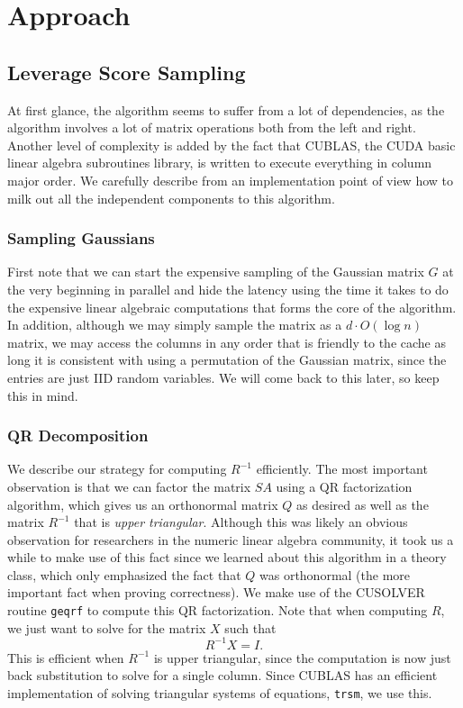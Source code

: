 \documentclass[12pt]{article}
\begin{document}
\section{Approach}

\subsection{Leverage Score Sampling}
At first glance, the algorithm seems to suffer from a lot of dependencies, as the algorithm involves a lot of matrix operations both from the left and right. Another level of complexity is added by the fact that CUBLAS, the CUDA basic linear algebra subroutines library, is written to execute everything in column major order. We carefully describe from an implementation point of view how to milk out all the independent components to this algorithm.

\subsubsection{Sampling Gaussians}
First note that we can start the expensive sampling of the Gaussian matrix $G$ at the very beginning in parallel and hide the latency using the time it takes to do the expensive linear algebraic computations that forms the core of the algorithm. In addition, although we may simply sample the matrix as a $d\cdot O(\log n)$ matrix, we may access the columns in any order that is friendly to the cache as long it is consistent with using a permutation of the Gaussian matrix, since the entries are just IID random variables. We will come back to this later, so keep this in mind. 

\subsubsection{QR Decomposition}
We describe our strategy for computing $R^{-1}$ efficiently. The most important observation is that we can factor the matrix $SA$ using a QR factorization algorithm, which gives us an orthonormal matrix $Q$ as desired as well as the matrix $R^{-1}$ that is \emph{upper triangular}. Although this was likely an obvious observation for researchers in the numeric linear algebra community, it took us a while to make use of this fact since we learned about this algorithm in a theory class, which only emphasized the fact that $Q$ was orthonormal (the more important fact when proving correctness). We make use of the CUSOLVER routine \texttt{geqrf} to compute this QR factorization. Note that when computing $R$, we just want to solve for the matrix $X$ such that
\[
	R^{-1}X = I.
\]
This is efficient when $R^{-1}$ is upper triangular, since the computation is now just back substitution to solve for a single column. Since CUBLAS has an efficient implementation of solving triangular systems of equations, \texttt{trsm}, we use this. 
\end{document}
